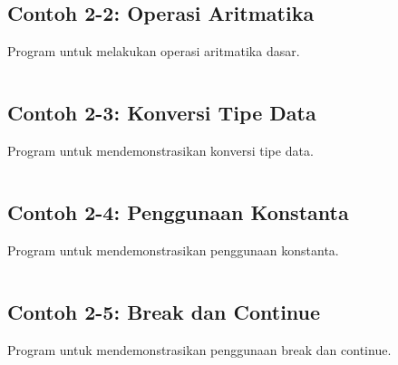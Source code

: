 \begin{lstlisting}[language=c++, caption=Deklarasi dan Inisialisasi Variabel]

\end{lstlisting}

\subsection{Contoh 2-2: Operasi Aritmatika}

Program untuk melakukan operasi aritmatika dasar.

\begin{lstlisting}[language=c++, caption=Operasi Aritmatika]

\end{lstlisting}

\subsection{Contoh 2-3: Konversi Tipe Data}

Program untuk mendemonstrasikan konversi tipe data.

\begin{lstlisting}[language=c++, caption=Konversi Tipe Data]

\end{lstlisting}

\subsection{Contoh 2-4: Penggunaan Konstanta}

Program untuk mendemonstrasikan penggunaan konstanta.

\begin{lstlisting}[language=c++, caption=Penggunaan Konstanta]

\end{lstlisting}

\subsection{Contoh 2-5: Break dan Continue}

Program untuk mendemonstrasikan penggunaan break dan continue.

\begin{lstlisting}[language=c++, caption=Break dan Continue]

\end{lstlisting}

